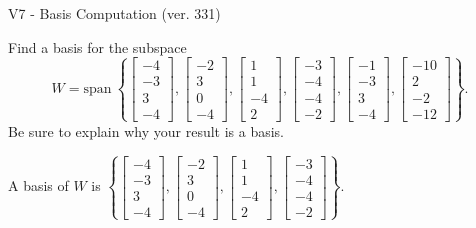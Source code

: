 \begin{exercise}
  \begin{exerciseTitle}V7 - Basis Computation (ver. 331)\end{exerciseTitle}
  \begin{exerciseStatement}
    Find a basis for the subspace 
\[W=\mathrm{span}\ \left\{\left[\begin{array}{r}
-4 \\
-3 \\
3 \\
-4
\end{array}\right] , \left[\begin{array}{r}
-2 \\
3 \\
0 \\
-4
\end{array}\right] , \left[\begin{array}{r}
1 \\
1 \\
-4 \\
2
\end{array}\right] , \left[\begin{array}{r}
-3 \\
-4 \\
-4 \\
-2
\end{array}\right] , \left[\begin{array}{r}
-1 \\
-3 \\
3 \\
-4
\end{array}\right] , \left[\begin{array}{r}
-10 \\
2 \\
-2 \\
-12
\end{array}\right]\right\}.\]
 Be sure to explain why your result is a basis.


  \end{exerciseStatement}
  \begin{exerciseAnswer}
   A basis of \(W\) is  \(\left\{\left[\begin{array}{r}
-4 \\
-3 \\
3 \\
-4
\end{array}\right] , \left[\begin{array}{r}
-2 \\
3 \\
0 \\
-4
\end{array}\right] , \left[\begin{array}{r}
1 \\
1 \\
-4 \\
2
\end{array}\right] , \left[\begin{array}{r}
-3 \\
-4 \\
-4 \\
-2
\end{array}\right]\right\}\).
  


  \end{exerciseAnswer}
\end{exercise}